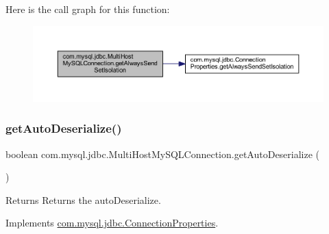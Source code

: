 Here is the call graph for this function\+:
\nopagebreak
\begin{figure}[H]
\begin{center}
\leavevmode
\includegraphics[width=350pt]{classcom_1_1mysql_1_1jdbc_1_1_multi_host_my_s_q_l_connection_afdb9d1814ebb8c261112e3c959aaf10b_cgraph}
\end{center}
\end{figure}
\mbox{\label{classcom_1_1mysql_1_1jdbc_1_1_multi_host_my_s_q_l_connection_aad67a9027c49b02592706d86bf9497db}} 
\subsubsection{\texorpdfstring{get\+Auto\+Deserialize()}{getAutoDeserialize()}}
{\footnotesize\ttfamily boolean com.\+mysql.\+jdbc.\+Multi\+Host\+My\+S\+Q\+L\+Connection.\+get\+Auto\+Deserialize (\begin{DoxyParamCaption}{ }\end{DoxyParamCaption})}

\begin{DoxyReturn}{Returns}
Returns the auto\+Deserialize. 
\end{DoxyReturn}


Implements \mbox{\hyperlink{interfacecom_1_1mysql_1_1jdbc_1_1_connection_properties_aee9fe485d01db5f2c0094702cd16468e}{com.\+mysql.\+jdbc.\+Connection\+Properties}}.

